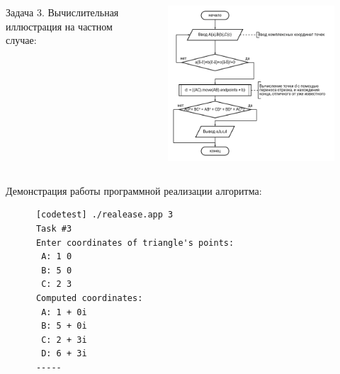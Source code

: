 \documentclass{beamer}
\begin{document}
\begin{frame}
   \begin{columns}
      \begin{column}{0.3\textwidth}
         \begin{block}{Задача 3. Вычислительная иллюстрация на частном случае:}
         \end{block}
      \end{column}
      \begin{column}{0.7\textwidth}
         \begin{figure}[h]
            \includegraphics[width=1\textwidth]{images/task3-diagram.png}
         \end{figure}
      \end{column}
   \end{columns}
\end{frame}

\begin{frame}[fragile]
   Демонстрация работы программной реализации алгоритма:
   \begin{verbatim}
      [codetest] ./realease.app 3
      Task #3
      Enter coordinates of triangle's points:
       A: 1 0
       B: 5 0
       C: 2 3
      Computed coordinates:
       A: 1 + 0i
       B: 5 + 0i
       C: 2 + 3i
       D: 6 + 3i
      -----
   \end{verbatim}
\end{frame}
\end{document}
